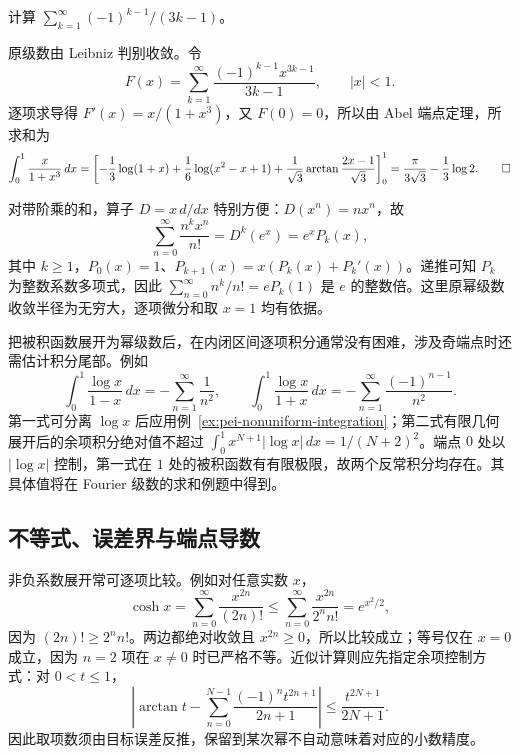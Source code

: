 \begin{example}
计算 $\sum_{k=1}^{\infty}(-1)^{k-1}/(3k-1)$。
\end{example}
\begin{solve}
原级数由 Leibniz 判别收敛。令
\[
 F(x)=\sum_{k=1}^{\infty}\frac{(-1)^{k-1}x^{3k-1}}{3k-1},\qquad |x|<1.
\]
逐项求导得 $F'(x)=x/(1+x^3)$，又 $F(0)=0$，所以由 Abel 端点定理，所求和为
\[
 \int_0^1\frac{x}{1+x^3}\,dx
 =\left[-\frac13\log(1+x)+\frac16\log(x^2-x+1)
 +\frac1{\sqrt3}\arctan\frac{2x-1}{\sqrt3}\right]_0^1
 =\frac{\pi}{3\sqrt3}-\frac13\log2.
 \qedhere
\]
\end{solve}

对带阶乘的和，算子 $D=x\,d/dx$ 特别方便：$D(x^n)=nx^n$，故
\[
 \sum_{n=0}^{\infty}\frac{n^kx^n}{n!}=D^k(e^x)=e^xP_k(x),
\]
其中 $k\geq1$，$P_0(x)=1$、$P_{k+1}(x)=x(P_k(x)+P_k'(x))$。递推可知 $P_k$ 为整数系数多项式，因此 $\sum_{n=0}^{\infty}n^k/n!=eP_k(1)$ 是 $e$ 的整数倍。这里原幂级数收敛半径为无穷大，逐项微分和取 $x=1$ 均有依据。

把被积函数展开为幂级数后，在内闭区间逐项积分通常没有困难，涉及奇端点时还需估计积分尾部。例如
\[
 \int_0^1\frac{\log x}{1-x}\,dx=-\sum_{n=1}^{\infty}\frac1{n^2},\qquad
 \int_0^1\frac{\log x}{1+x}\,dx=-\sum_{n=1}^{\infty}\frac{(-1)^{n-1}}{n^2}.
\]
第一式可分离 $\log x$ 后应用例~\ref{ex:pei-nonuniform-integration}；第二式有限几何展开后的余项积分绝对值不超过 $\int_0^1x^{N+1}|\log x|\,dx=1/(N+2)^2$。端点 $0$ 处以 $|\log x|$ 控制，第一式在 $1$ 处的被积函数有有限极限，故两个反常积分均存在。其具体值将在 Fourier 级数的求和例题中得到。

\subsection{不等式、误差界与端点导数}

非负系数展开常可逐项比较。例如对任意实数 $x$，
\[
 \cosh x=\sum_{n=0}^{\infty}\frac{x^{2n}}{(2n)!}
 \leq\sum_{n=0}^{\infty}\frac{x^{2n}}{2^nn!}=e^{x^2/2},
\]
因为 $(2n)!\geq2^nn!$。两边都绝对收敛且 $x^{2n}\geq0$，所以比较成立；等号仅在 $x=0$ 成立，因为 $n=2$ 项在 $x\ne0$ 时已严格不等。近似计算则应先指定余项控制方式：对 $0<t\leq1$，
\[
 \left|\arctan t-\sum_{n=0}^{N-1}\frac{(-1)^nt^{2n+1}}{2n+1}\right|
 \leq\frac{t^{2N+1}}{2N+1}.
\]
因此取项数须由目标误差反推，保留到某次幂不自动意味着对应的小数精度。

